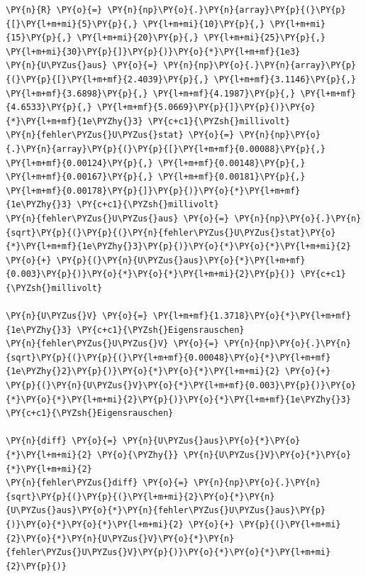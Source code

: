     \begin{tcolorbox}[breakable, size=fbox, boxrule=1pt, pad at break*=1mm,colback=cellbackground, colframe=cellborder]
\begin{Verbatim}[commandchars=\\\{\}]
\PY{n}{R} \PY{o}{=} \PY{n}{np}\PY{o}{.}\PY{n}{array}\PY{p}{(}\PY{p}{[}\PY{l+m+mi}{5}\PY{p}{,} \PY{l+m+mi}{10}\PY{p}{,} \PY{l+m+mi}{15}\PY{p}{,} \PY{l+m+mi}{20}\PY{p}{,} \PY{l+m+mi}{25}\PY{p}{,} \PY{l+m+mi}{30}\PY{p}{]}\PY{p}{)}\PY{o}{*}\PY{l+m+mf}{1e3} 
\PY{n}{U\PYZus{}aus} \PY{o}{=} \PY{n}{np}\PY{o}{.}\PY{n}{array}\PY{p}{(}\PY{p}{[}\PY{l+m+mf}{2.4039}\PY{p}{,} \PY{l+m+mf}{3.1146}\PY{p}{,} \PY{l+m+mf}{3.6898}\PY{p}{,} \PY{l+m+mf}{4.1987}\PY{p}{,} \PY{l+m+mf}{4.6533}\PY{p}{,} \PY{l+m+mf}{5.0669}\PY{p}{]}\PY{p}{)}\PY{o}{*}\PY{l+m+mf}{1e\PYZhy{}3} \PY{c+c1}{\PYZsh{}millivolt}
\PY{n}{fehler\PYZus{}U\PYZus{}stat} \PY{o}{=} \PY{n}{np}\PY{o}{.}\PY{n}{array}\PY{p}{(}\PY{p}{[}\PY{l+m+mf}{0.00088}\PY{p}{,} \PY{l+m+mf}{0.00124}\PY{p}{,} \PY{l+m+mf}{0.00148}\PY{p}{,} \PY{l+m+mf}{0.00167}\PY{p}{,} \PY{l+m+mf}{0.00181}\PY{p}{,} \PY{l+m+mf}{0.00178}\PY{p}{]}\PY{p}{)}\PY{o}{*}\PY{l+m+mf}{1e\PYZhy{}3} \PY{c+c1}{\PYZsh{}millivolt}
\PY{n}{fehler\PYZus{}U\PYZus{}aus} \PY{o}{=} \PY{n}{np}\PY{o}{.}\PY{n}{sqrt}\PY{p}{(}\PY{p}{(}\PY{n}{fehler\PYZus{}U\PYZus{}stat}\PY{o}{*}\PY{l+m+mf}{1e\PYZhy{}3}\PY{p}{)}\PY{o}{*}\PY{o}{*}\PY{l+m+mi}{2} \PY{o}{+} \PY{p}{(}\PY{n}{U\PYZus{}aus}\PY{o}{*}\PY{l+m+mf}{0.003}\PY{p}{)}\PY{o}{*}\PY{o}{*}\PY{l+m+mi}{2}\PY{p}{)} \PY{c+c1}{\PYZsh{}millivolt}

\PY{n}{U\PYZus{}V} \PY{o}{=} \PY{l+m+mf}{1.3718}\PY{o}{*}\PY{l+m+mf}{1e\PYZhy{}3} \PY{c+c1}{\PYZsh{}Eigensrauschen}
\PY{n}{fehler\PYZus{}U\PYZus{}V} \PY{o}{=} \PY{n}{np}\PY{o}{.}\PY{n}{sqrt}\PY{p}{(}\PY{p}{(}\PY{l+m+mf}{0.00048}\PY{o}{*}\PY{l+m+mf}{1e\PYZhy{}2}\PY{p}{)}\PY{o}{*}\PY{o}{*}\PY{l+m+mi}{2} \PY{o}{+} \PY{p}{(}\PY{n}{U\PYZus{}V}\PY{o}{*}\PY{l+m+mf}{0.003}\PY{p}{)}\PY{o}{*}\PY{o}{*}\PY{l+m+mi}{2}\PY{p}{)}\PY{o}{*}\PY{l+m+mf}{1e\PYZhy{}3} \PY{c+c1}{\PYZsh{}Eigensrauschen}

\PY{n}{diff} \PY{o}{=} \PY{n}{U\PYZus{}aus}\PY{o}{*}\PY{o}{*}\PY{l+m+mi}{2} \PY{o}{\PYZhy{}} \PY{n}{U\PYZus{}V}\PY{o}{*}\PY{o}{*}\PY{l+m+mi}{2}
\PY{n}{fehler\PYZus{}diff} \PY{o}{=} \PY{n}{np}\PY{o}{.}\PY{n}{sqrt}\PY{p}{(}\PY{p}{(}\PY{l+m+mi}{2}\PY{o}{*}\PY{n}{U\PYZus{}aus}\PY{o}{*}\PY{n}{fehler\PYZus{}U\PYZus{}aus}\PY{p}{)}\PY{o}{*}\PY{o}{*}\PY{l+m+mi}{2} \PY{o}{+} \PY{p}{(}\PY{l+m+mi}{2}\PY{o}{*}\PY{n}{U\PYZus{}V}\PY{o}{*}\PY{n}{fehler\PYZus{}U\PYZus{}V}\PY{p}{)}\PY{o}{*}\PY{o}{*}\PY{l+m+mi}{2}\PY{p}{)}


\end{Verbatim}
\end{tcolorbox}
